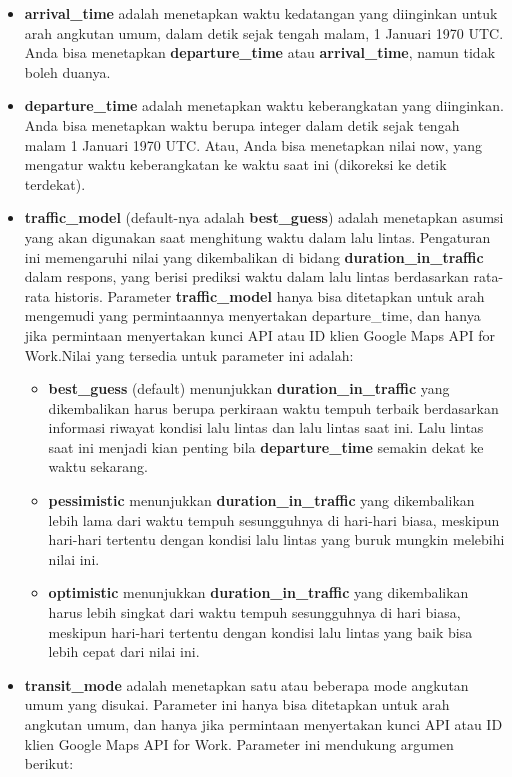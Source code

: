 \begin{itemize}
	\item \textbf{arrival\_time} adalah menetapkan waktu kedatangan yang diinginkan untuk arah angkutan umum, dalam detik sejak tengah malam, 1 Januari 1970 UTC. Anda bisa menetapkan \textbf{departure\_time} atau \textbf{arrival\_time}, namun tidak boleh duanya.
	\item \textbf{departure\_time} adalah menetapkan waktu keberangkatan yang diinginkan. Anda bisa menetapkan waktu berupa integer dalam detik sejak tengah malam 1 Januari 1970 UTC. Atau, Anda bisa menetapkan nilai now, yang mengatur waktu keberangkatan ke waktu saat ini (dikoreksi ke detik terdekat). 
	\item \textbf{traffic\_model} (default-nya adalah \textbf{best\_guess}) adalah menetapkan asumsi yang akan digunakan saat menghitung waktu dalam lalu lintas. Pengaturan ini memengaruhi nilai yang dikembalikan di bidang \textbf{duration\_in\_traffic} dalam respons, yang berisi prediksi waktu dalam lalu lintas berdasarkan rata-rata historis. Parameter \textbf{traffic\_model} hanya bisa ditetapkan untuk arah mengemudi yang permintaannya menyertakan departure\_time, dan hanya jika permintaan menyertakan kunci API atau ID klien Google Maps API for Work.Nilai yang tersedia untuk parameter ini adalah: 
	\begin{itemize}
		\item \textbf{best\_guess} (default) menunjukkan \textbf{duration\_in\_traffic} yang dikembalikan harus berupa perkiraan waktu tempuh terbaik berdasarkan informasi riwayat kondisi lalu lintas dan lalu lintas saat ini. Lalu lintas saat ini menjadi kian penting bila \textbf{departure\_time} semakin dekat ke waktu sekarang.
		\item \textbf{pessimistic} menunjukkan \textbf{duration\_in\_traffic} yang dikembalikan lebih lama dari waktu tempuh sesungguhnya di hari-hari biasa, meskipun hari-hari tertentu dengan kondisi lalu lintas yang buruk mungkin melebihi nilai ini.
		\item \textbf{optimistic} menunjukkan \textbf{duration\_in\_traffic} yang dikembalikan harus lebih singkat dari waktu tempuh sesungguhnya di hari biasa, meskipun hari-hari tertentu dengan kondisi lalu lintas yang baik bisa lebih cepat dari nilai ini.
	\end{itemize}
	\item \textbf{transit\_mode} adalah menetapkan satu atau beberapa mode angkutan umum yang disukai. Parameter ini hanya bisa ditetapkan untuk arah angkutan umum, dan hanya jika permintaan menyertakan kunci API atau ID klien Google Maps API for Work. Parameter ini mendukung argumen berikut:

\end{itemize}
